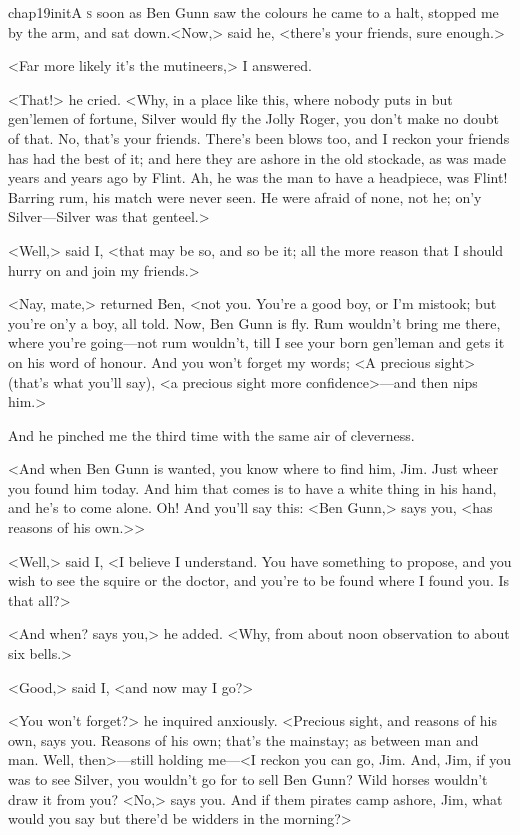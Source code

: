
\lettrine{chap19initA}{ s} soon as Ben Gunn saw the colours he came to a halt, stopped me by the arm, and sat down.<Now,> said he, <there's your friends, sure enough.> 

\zz
<Far more likely it's the mutineers,> I answered.
  
\zz
<That!> he cried. <Why, in a place like this, where nobody puts in but gen'lemen of fortune, Silver would fly the Jolly Roger, you don't make no doubt of that. No, that's your friends. There's been blows too, and I reckon your friends has had the best of it; and here they are ashore in the old stockade, as was made years and years ago by Flint. Ah, he was the man to have a headpiece, was Flint! Barring rum, his match were never seen. He were afraid of none, not he; on'y Silver—Silver was that genteel.>

<Well,> said I, <that may be so, and so be it; all the more reason that I should hurry on and join my friends.>

<Nay, mate,> returned Ben, <not you. You're a good boy, or I'm mistook; but you're on'y a boy, all told. Now, Ben Gunn is fly. Rum wouldn't bring me there, where you're going—not rum wouldn't, till I see your born gen'leman and gets it on his word of honour. And you won't forget my words; <A precious sight> (that's what you'll say), <a precious sight more confidence>—and then nips him.>

And he pinched me the third time with the same air of cleverness.

<And when Ben Gunn is wanted, you know where to find him, Jim. Just wheer you found him today. And him that comes is to have a white thing in his hand, and he's to come alone. Oh! And you'll say this: <Ben Gunn,> says you, <has reasons of his own.>>

<Well,> said I, <I believe I understand. You have something to propose, and you wish to see the squire or the doctor, and you're to be found where I found you. Is that all?>

<And when? says you,> he added. <Why, from about noon observation to about six bells.>

<Good,> said I, <and now may I go?>

<You won't forget?> he inquired anxiously. <Precious sight, and reasons of his own, says you. Reasons of his own; that's the mainstay; as between man and man. Well, then>—still holding me—<I reckon you can go, Jim. And, Jim, if you was to see Silver, you wouldn't go for to sell Ben Gunn? Wild horses wouldn't draw it from you? <No,> says you. And if them pirates camp ashore, Jim, what would you say but there'd be widders in the morning?>

